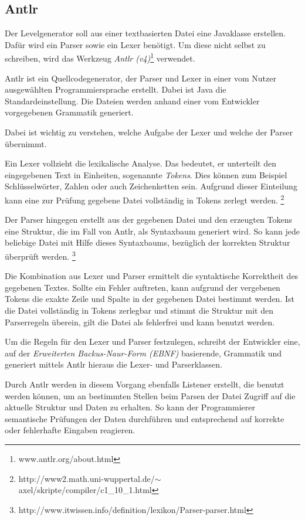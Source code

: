 \subsection{Antlr}

Der Levelgenerator soll aus einer textbasierten Datei eine Javaklasse erstellen.
Dafür wird ein Parser sowie ein Lexer benötigt.
Um diese nicht selbst zu schreiben, wird das Werkzeug \textit{Antlr (v4)}\footnote{www.antlr.org/about.html} verwendet.

Antlr ist ein Quellcodegenerator, der Parser und Lexer in einer vom Nutzer ausgewählten Programmiersprache erstellt. Dabei ist Java die Standardeinstellung. Die Dateien werden anhand einer vom Entwickler vorgegebenen Grammatik generiert. 

Dabei ist wichtig zu verstehen, welche Aufgabe der Lexer und welche der Parser übernimmt.

Ein Lexer vollzieht die lexikalische Analyse. Das bedeutet, er unterteilt den eingegebenen Text in Einheiten, sogenannte \textit{Tokens}.
Dies können zum Beispiel Schlüsselwörter, Zahlen oder auch Zeichenketten sein.
Aufgrund dieser Einteilung kann eine zur Prüfung gegebene Datei vollständig in Tokens zerlegt werden. 
\footnote{http://www2.math.uni-wuppertal.de/$\sim$axel/skripte/compiler/c1\_10\_1.html} 

Der Parser hingegen erstellt aus der gegebenen Datei und den erzeugten Tokens eine Struktur, die im Fall von Antlr, als Syntaxbaum generiert wird.
So kann jede beliebige Datei mit Hilfe dieses Syntaxbaums, bezüglich der korrekten Struktur überprüft werden. \footnote{http://www.itwissen.info/definition/lexikon/Parser-parser.html}

Die Kombination aus Lexer und Parser ermittelt die syntaktische Korrektheit des gegebenen Textes. Sollte ein Fehler auftreten, kann aufgrund der vergebenen Tokens die exakte Zeile und Spalte in der gegebenen Datei bestimmt werden. Ist die Datei vollständig in Tokens zerlegbar und stimmt die Struktur mit den Parserregeln überein, gilt die Datei als fehlerfrei und kann benutzt werden.

Um die Regeln für den Lexer und Parser festzulegen, schreibt der Entwickler eine, auf der \textit{Erweiterten Backus-Naur-Form (EBNF)} basierende, Grammatik und generiert mittels Antlr hieraus die Lexer- und Parserklassen.

Durch Antlr werden in diesem Vorgang ebenfalls Listener erstellt, die benutzt werden können, um an bestimmten Stellen beim Parsen der Datei Zugriff auf die aktuelle Struktur und Daten zu erhalten. So kann der Programmierer semantische Prüfungen der Daten durchführen und entsprechend auf korrekte oder fehlerhafte Eingaben reagieren.

